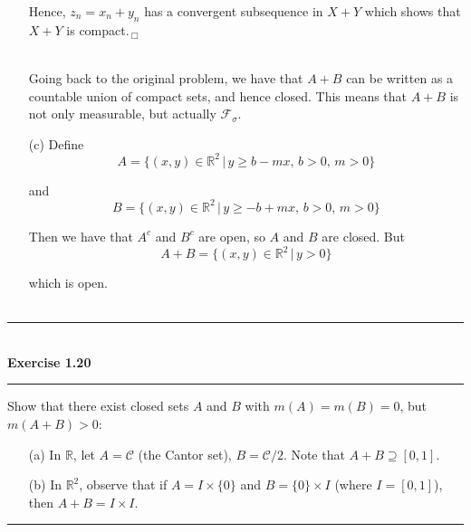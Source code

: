 \documentclass[a4paper,11pt]{article}
\begin{document}
\begin{enumerate}
	Hence, $z_n = x_n + y_n$ has a convergent subsequence in $X + Y$ which shows that $X + Y$ is compact.\,$_\Box$\\\

	Going back to the original problem, we have that $A + B$ can be written as a countable union of compact sets, and hence closed. This means that $A + B$ is not only measurable, but actually $\mathcal{F}_\sigma$.\\

	\item [(c)] Define
		$$A = \{(x,y) \in \mathbb{R}^2\,
		|\, y \geq b - mx,\, b > 0,\, m > 0\}$$

	and
		$$B = \{(x,y) \in \mathbb{R}^2\,
		|\, y \geq  -b + mx,\, b > 0,\, m > 0\}$$

	Then we have that $A^c$ and $B^c$ are open, so $A$ and $B$ are closed. But
		$$A + B = \{(x,y) \in \mathbb{R}^2 \,|\, y > 0\}$$

	which is open.\\\\
\end{enumerate}


\begin{flushleft}
	\rule[-0.5ex]{17cm}{2pt}\\
		\textbf{Exercise 1.20}\\
	\rule[1.5ex]{17cm}{0.5pt}
		Show that there exist closed sets $A$ and $B$ with $m(A) = m(B) = 0$, but $m(A + B) > 0$:
		\begin{enumerate}
			\item [(a)] In $\mathbb{R}$, let $A = \mathcal{C}$ (the Cantor set), $B = \mathcal{C}/2$. Note that $A + B \supseteq [0, 1]$.

			\item [(b)] In $\mathbb{R}^2$, observe that if $A = I \times \{0\}$ and $B = \{0\} \times I$ (where $I = [0, 1]$), then $A + B = I \times I$.
		\end{enumerate}
	\rule[1.0ex]{17cm}{0.5pt}\
\end{flushleft}
\end{document}
